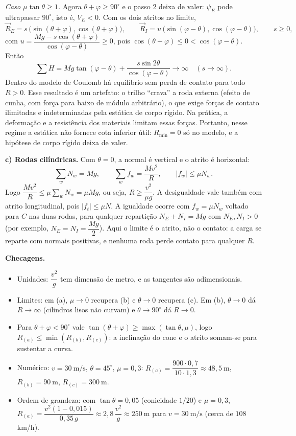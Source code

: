\documentclass{article}%
\begin{document}
\emph{Caso $\mu\tan\theta\ge 1$.} Agora $\theta+\varphi\ge 90^\circ$ e o passo 2 deixa de valer: $\psi_E$ pode ultrapassar $90^\circ$, isto é, $V_E<0$. Com os dois atritos no limite,
\[
\vec R_E=s\,\bigl(\sin(\theta+\varphi),\cos(\theta+\varphi)\bigr),\qquad \vec R_I=u\,\bigl(\sin(\varphi-\theta),\cos(\varphi-\theta)\bigr),\qquad s\ge 0,
\]
com $u=\dfrac{Mg-s\cos(\theta+\varphi)}{\cos(\varphi-\theta)}\ge 0$, pois $\cos(\theta+\varphi)\le 0<\cos(\varphi-\theta)$. Então
\[
\sum H=Mg\tan(\varphi-\theta)+\frac{s\sin 2\theta}{\cos(\varphi-\theta)}\longrightarrow\infty\quad (s\to\infty).
\]
Dentro do modelo de Coulomb há equilíbrio sem perda de contato para todo $R>0$. Esse resultado é um artefato: o trilho ``crava'' a roda externa (efeito de cunha, com força para baixo de módulo arbitrário), o que exige forças de contato ilimitadas e indeterminadas pela estática de corpo rígido. Na prática, a deformação e a resistência dos materiais limitam essas forças. Portanto, nesse regime a estática não fornece cota inferior útil: $R_{\min}=0$ só no modelo, e a hipótese de corpo rígido deixa de valer.

\textbf{c) Rodas cilíndricas.} Com $\theta=0$, a normal é vertical e o atrito é horizontal:
\[
\sum_w N_w=Mg,\qquad \sum_w f_w=\frac{Mv^2}{R},\qquad |f_w|\le\mu N_w.
\]
Logo $\dfrac{Mv^2}{R}\le\mu\sum_w N_w=\mu Mg$, ou seja, $R\ge \dfrac{v^2}{\mu g}$. A desigualdade vale também com atrito longitudinal, pois $|f_t|\le\mu N$. A igualdade ocorre com $f_w=\mu N_w$ voltado para $C$ nas duas rodas, para qualquer repartição $N_E+N_I=Mg$ com $N_E,N_I>0$ (por exemplo, $N_E=N_I=\dfrac{Mg}{2}$). Aqui o limite é o atrito, não o contato: a carga se reparte com normais positivas, e nenhuma roda perde contato para qualquer $R$.

\textbf{Checagens.}
\begin{itemize}
\item Unidades: $\dfrac{v^2}{g}$ tem dimensão de metro, e as tangentes são adimensionais.
\item Limites: em (a), $\mu\to 0$ recupera (b) e $\theta\to 0$ recupera (c). Em (b), $\theta\to 0$ dá $R\to\infty$ (cilindros lisos não curvam) e $\theta\to 90^\circ$ dá $R\to 0$.
\item Para $\theta+\varphi<90^\circ$ vale $\tan(\theta+\varphi)\ge\max(\tan\theta,\mu)$, logo $R_{(a)}\le\min(R_{(b)},R_{(c)})$: a inclinação do cone e o atrito somam-se para sustentar a curva.
\item Numérico: $v=30\ \text{m/s}$, $\theta=45^\circ$, $\mu=0{,}3$: $R_{(a)}=\dfrac{900\cdot 0{,}7}{10\cdot 1{,}3}\approx 48{,}5\ \text{m}$, $R_{(b)}=90\ \text{m}$, $R_{(c)}=300\ \text{m}$.
\item Ordem de grandeza: com $\tan\theta=0{,}05$ (conicidade $1/20$) e $\mu=0{,}3$, $R_{(a)}=\dfrac{v^2(1-0{,}015)}{0{,}35\,g}\approx 2{,}8\,\dfrac{v^2}{g}\approx 250\ \text{m}$ para $v=30\ \text{m/s}$ (cerca de $108$ km/h).
\end{itemize}
\end{document}
